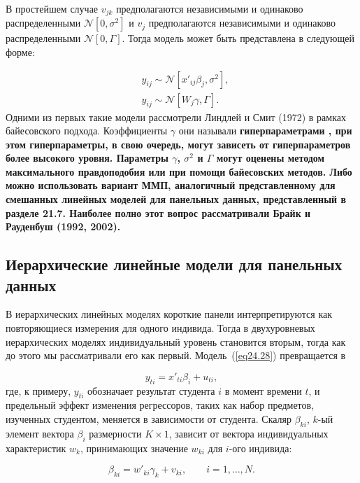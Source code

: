 В простейшем случае $v_{jk}$ предполагаются независимыми и одинаково распределенными $\mathcal N [0, \sigma^2]$ и $v_j$ предполагаются независимыми и одинаково распределенными $\mathcal N [0, \Gamma]$. Тогда модель может быть представлена в следующей форме:

\begin{align}
& y_{ij} \sim \mathcal N [x'_{ij} \beta_j, \sigma^2], \nonumber\\
& y_{ij} \sim \mathcal N [W_j \gamma, \Gamma]. \nonumber
\end{align}
Одними из первых такие модели рассмотрели Линдлей и Смит (1972) в рамках байесовского подхода. Коэффициенты $\gamma$ они называли \bfseries гиперпараметрами \mdseries, при этом гиперпараметры, в свою очередь, могут зависеть от гиперпараметров более высокого уровня. Параметры $\gamma$, $\sigma^2$ и $\Gamma$ могут оценены методом максимального правдоподобия или при помощи байесовских методов. Либо можно использовать вариант ММП, аналогичный представленному для смешанных линейных моделей для панельных данных, представленный в разделе 21.7. Наиболее полно этот вопрос рассматривали Брайк и Рауденбуш (1992, 2002). 

\subsection{Иерархические линейные модели для панельных данных}

В иерархических линейных моделях короткие панели интерпретируются как повторяющиеся измерения для одного индивида. Тогда в двухуровневых иерархических моделях индивидуальный уровень становится вторым, тогда как до этого мы рассматривали его как первый. Модель~(\ref{eq24.28}) превращается в

\begin{equation}
\label{eq24.53}
y_{ti} = x'_{ti} \beta_i + u_{ti},
\end{equation}
где, к примеру, $y_{ti}$ обозначает результат студента $i$ в момент времени $t$, и предельный эффект изменения регрессоров, таких как набор предметов, изученных студентом, меняется в зависимости от студента. Скаляр $\beta_{ki}$, $k$-ый элемент вектора $\beta_i$ размерности $K \times 1$, зависит от вектора индивидуальных характеристик $w_k$, принимающих значение $w_{ki}$ для $i$-ого индивида:

\begin{equation}
\label{eq24.54}
\beta_{ki} = w'_{ki} \gamma_k + v_{ki}, \qquad i = 1, \dots, N.
\end{equation}

